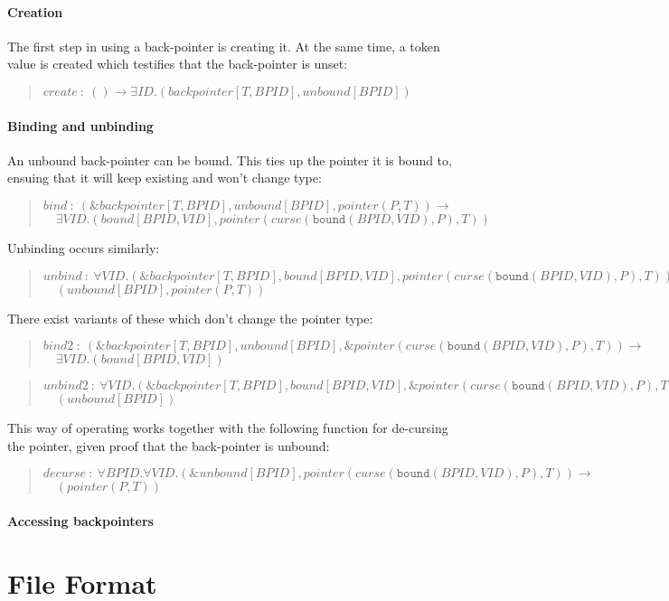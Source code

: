 \documentclass[a4paper]{book}
\newcommand\FuncSignature[2]{\begin{quote}$\mathit{#1}\ :\ \mathit{#2}$\end{quote}}
\newcommand\FuncSignatureII[3]{\begin{quote}$\mathit{#1}\ :\ \mathit{#2} \to$\\${}\quad \mathit{#3}$ \end{quote}}
\begin{document}
\subsection*{Creation}
The first step in using a back-pointer is creating it.
At the same time, a token value is created which testifies that the
back-pointer is unset:
\FuncSignature{create}{() \to \exists ID.(backpointer[T,BPID], unbound[BPID])}

\subsection*{Binding and unbinding}
An unbound back-pointer can be bound. This ties up the pointer it is
bound to, ensuing that it will keep existing and won't change type:
\FuncSignatureII{bind}{(\&backpointer[T,BPID], unbound[BPID], pointer(P,T))}
{\exists VID.(bound[BPID,VID], pointer(curse(\texttt{bound}(BPID,VID),P),T))}

\noindent
Unbinding occurs similarly:
\FuncSignatureII{unbind}{
\forall VID.(\&backpointer[T,BPID], bound[BPID,VID], pointer(curse(\texttt{bound}(BPID,VID),P),T))}
{(unbound[BPID], pointer(P,T))}

\noindent
There exist variants of these which don't change the pointer type:
\FuncSignatureII{bind2}{(\&backpointer[T,BPID], unbound[BPID], \&pointer(curse(\texttt{bound}(BPID,VID),P),T))}{\exists VID.(bound[BPID,VID])}

\FuncSignatureII{unbind2}{
\forall VID.(\&backpointer[T,BPID], bound[BPID,VID], \&pointer(curse(\texttt{bound}(BPID,VID),P),T))}
{(unbound[BPID])}

\noindent
This way of operating works together with the following function for
de-cursing the pointer, given proof that the back-pointer is unbound:

\FuncSignatureII{decurse}{\forall BPID.\forall VID.(\&unbound[BPID], pointer(curse(\texttt{bound}(BPID,VID),P),T))}
{(pointer(P,T))}

\subsection*{Accessing backpointers}



\part{File Format}
\end{document}
